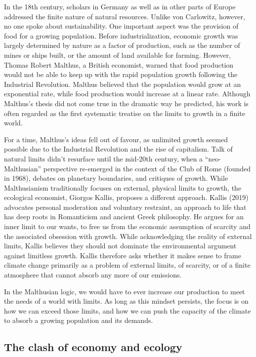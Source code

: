 \documentclass[
  a4paper,
  DIV=11,
  numbers=noendperiod,
  oneside,
  openany]{scrreprt}
\begin{document}
In the 18th century, scholars in Germany as well as in other parts of
Europe addressed the finite nature of natural resources. Unlike von
Carlowitz, however, no one spoke about sustainability. One important
aspect was the provision of food for a growing population. Before
industrialization, economic growth was largely determined by nature as a
factor of production, such as the number of mines or ships built, or the
amount of land available for farming. However, Thomas Robert Malthus, a
British economist, warned that food production would not be able to keep
up with the rapid population growth following the Industrial Revolution.
Malthus believed that the population would grow at an exponential rate,
while food production would increase at a linear rate. Although
Malthus's thesis did not come true in the dramatic way he predicted, his
work is often regarded as the first systematic treatise on the limits to
growth in a finite world.

For a time, Malthus's ideas fell out of favour, as unlimited growth
seemed possible due to the Industrial Revolution and the rise of
capitalism. Talk of natural limits didn't resurface until the mid-20th
century, when a ``neo-Malthusian'' perspective re-emerged in the context
of the Club of Rome (founded in 1968), debates on planetary boundaries,
and critiques of growth. While Malthusianism traditionally focuses on
external, physical limits to growth, the ecological economist, Giorgos
Kallis, proposes a different approach. Kallis (2019) advocates personal
moderation and voluntary restraint, an approach to life that has deep
roots in Romanticism and ancient Greek philosophy. He argues for an
inner limit to our wants, to free us from the economic assumption of
scarcity and the associated obsession with growth. While acknowledging
the reality of external limits, Kallis believes they should not dominate
the environmental argument against limitless growth. Kallis therefore
asks whether it makes sense to frame climate change primarily as a
problem of external limits, of scarcity, or of a finite atmosphere that
cannot absorb any more of our emissions.

In the Malthusian logic, we would have to ever increase our production
to meet the needs of a world with limits. As long as this mindset
persists, the focus is on how we can exceed those limits, and how we can
push the capacity of the climate to absorb a growing population and its
demands.

\subsection{The clash of economy and
ecology}\label{the-clash-of-economy-and-ecology}
\end{document}
